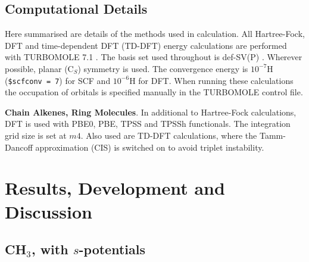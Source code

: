\documentclass[journal=jctcce,manuscript=article]{achemso}
\begin{document}
\subsection{Computational Details}

Here summarised are details of the methods used in calculation. All Hartree-Fock, DFT and time-dependent DFT (TD-DFT) energy calculations are performed with TURBOMOLE 7.1 \cite{TURBOMOLE}. The basis set used throughout is def-SV(P) \cite{defsvp}. Wherever possible, planar (C\(_{S}\)) symmetry is used. The convergence energy is \(10^{-7}\)H (\texttt{\$scfconv = 7}) for SCF and \(10^{-6}\)H for DFT. When running these calculations the occupation of orbitals is specified manually in the TURBOMOLE control file.

\textbf{Chain Alkenes, Ring Molecules}. In additional to Hartree-Fock calculations, DFT is used with PBE0, PBE, TPSS and TPSSh functionals. \cite{pbe0,pbe,tpss,tpssh} The integration grid size is set at \(m4\). Also used are TD-DFT calculations, where the Tamm-Dancoff approximation (CIS) \cite{tammdancoff} is switched on to avoid triplet instability.

\section{Results, Development and Discussion}
\subsection{CH\(_{3}\), with \(s\)-potentials}

\end{document}
